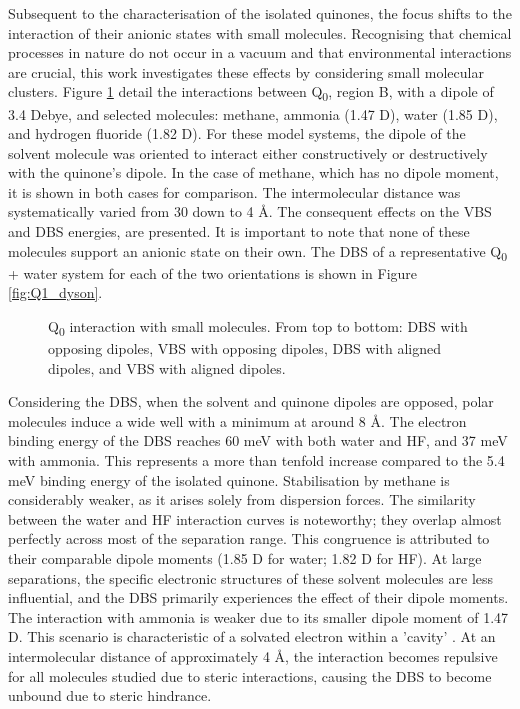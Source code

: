 Subsequent to the characterisation of the isolated quinones, the focus shifts to the interaction of their anionic states with small molecules. Recognising that chemical processes in nature do not occur in a vacuum and that environmental interactions are crucial, this work investigates these effects by considering small molecular clusters. Figure \ref{fig:scan_X} detail the interactions between Q\textsubscript{0}, region B, with a dipole of 3.4 Debye, and selected molecules: methane, ammonia (1.47 D), water (1.85 D), and hydrogen fluoride (1.82 D). For these model systems, the dipole of the solvent molecule was oriented to interact either constructively or destructively with the quinone's dipole. In the case of methane, which has no dipole moment, it is shown in both cases for comparison. The intermolecular distance was systematically varied from 30 down to 4 \r{A}. The consequent effects on the VBS and DBS energies, are presented. It is important to note that none of these molecules support an anionic state on their own. The DBS of a representative Q\textsubscript{0} + water system for each of the two orientations is shown in Figure \ref{fig:Q1_dyson}.

\begin{figure}[th!]
    \centering
    \small
    
    
    \caption[Q\textsubscript{0} interaction with small molecules]{Q\textsubscript{0} interaction with small molecules. From top to bottom: DBS with opposing dipoles, VBS with opposing dipoles, DBS with aligned dipoles, and VBS with aligned dipoles.}
    \label{fig:scan_X}
\end{figure}

Considering the DBS, when the solvent and quinone dipoles are opposed, polar molecules induce a wide well with a minimum at around 8 \r{A}. The electron binding energy of the DBS reaches 60 meV with both water and HF, and 37 meV with ammonia. This represents a more than tenfold increase compared to the 5.4 meV binding energy of the isolated quinone. Stabilisation by methane is considerably weaker, as it arises solely from dispersion forces. The similarity between the water and HF interaction curves is noteworthy; they overlap almost perfectly across most of the separation range. This congruence is attributed to their comparable dipole moments (1.85 D for water; 1.82 D for HF). At large separations, the specific electronic structures of these solvent molecules are less influential, and the DBS primarily experiences the effect of their dipole moments. The interaction with ammonia is weaker due to its smaller dipole moment of 1.47 D. This scenario is characteristic of a solvated electron within a 'cavity' \cite{jordan2003theory,herbert2019structure}. At an intermolecular distance of approximately 4 \r{A}, the interaction becomes repulsive for all molecules studied due to steric interactions, causing the DBS to become unbound due to steric hindrance.

